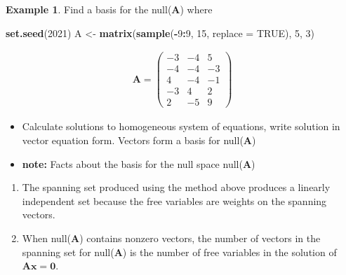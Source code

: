 \documentclass[
]{book}
\newenvironment{Shaded}{\begin{snugshade}}{\end{snugshade}}
\newcommand{\DataTypeTok}[1]{\textcolor[rgb]{0.13,0.29,0.53}{#1}}
\newcommand{\DecValTok}[1]{\textcolor[rgb]{0.00,0.00,0.81}{#1}}
\newcommand{\KeywordTok}[1]{\textcolor[rgb]{0.13,0.29,0.53}{\textbf{#1}}}
\newcommand{\NormalTok}[1]{#1}
\newcommand{\OperatorTok}[1]{\textcolor[rgb]{0.81,0.36,0.00}{\textbf{#1}}}
\newcommand{\OtherTok}[1]{\textcolor[rgb]{0.56,0.35,0.01}{#1}}
\newcommand{\StringTok}[1]{\textcolor[rgb]{0.31,0.60,0.02}{#1}}
\providecommand{\tightlist}{%
  \setlength{\itemsep}{0pt}\setlength{\parskip}{0pt}}
\theoremstyle{definition}
\theoremstyle{definition}
\newtheorem{example}{Example}[chapter]
\theoremstyle{definition}
\theoremstyle{definition}
\theoremstyle{remark}
\begin{document}
\begin{example}

Find a basis for the null(\(\mathbf{A}\)) where

\begin{Shaded}
\begin{Highlighting}[]
\KeywordTok{set.seed}\NormalTok{(}\DecValTok{2021}\NormalTok{)}
\NormalTok{A <-}\StringTok{ }\KeywordTok{matrix}\NormalTok{(}\KeywordTok{sample}\NormalTok{(}\OperatorTok{-}\DecValTok{9}\OperatorTok{:}\DecValTok{9}\NormalTok{, }\DecValTok{15}\NormalTok{, }\DataTypeTok{replace =} \OtherTok{TRUE}\NormalTok{), }\DecValTok{5}\NormalTok{, }\DecValTok{3}\NormalTok{)}
\end{Highlighting}
\end{Shaded}

\[
\begin{aligned}
\mathbf{A} = \begin{pmatrix} -3 & -4 & 5 \\ -4 & -4 & -3 \\ 4 & -4 & -1 \\ -3 & 4 & 2 \\ 2 & -5 & 9 \end{pmatrix}
\end{aligned}
\]

\begin{itemize}
\tightlist
\item
  Calculate solutions to homogeneous system of equations, write solution in vector equation form. Vectors form a basis for null(\(\mathbf{A}\))
\end{itemize}

\end{example}

\begin{itemize}
\tightlist
\item
  \textbf{note:} Facts about the basis for the null space null(\(\mathbf{A}\))
\end{itemize}

\begin{enumerate}
\def\labelenumi{\arabic{enumi})}
\item
  The spanning set produced using the method above produces a linearly independent set because the free variables are weights on the spanning vectors.
\item
  When null(\(\mathbf{A}\)) contains nonzero vectors, the number of vectors in the spanning set for null(\(\mathbf{A}\)) is the number of free variables in the solution of \(\mathbf{A} \mathbf{x} = \mathbf{0}\).
\end{enumerate}
\end{document}
